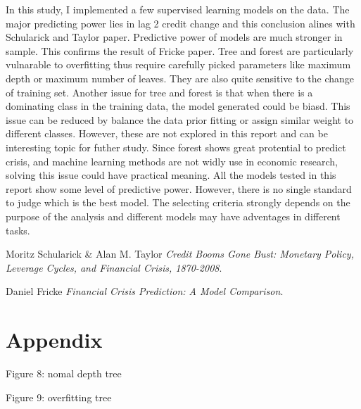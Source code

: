 \documentclass{article}
\newcommand{\ciapdf}[1]{\vspace*{-\parskip}\begin{center}\resizebox{0.75\textwidth}{!}{\texttt{[image: \#1]}}\end{center}}
\begin{document}
In this study, I implemented
a few supervised learning models on the data. The major predicting
power lies in lag 2 credit change and this conclusion alines with
Schularick and Taylor paper. Predictive power of models are much stronger in sample. This confirms the result of Fricke
paper. Tree and forest are particularly
vulnarable to overfitting thus require carefully picked parameters like
maximum depth or maximum number of leaves. They are also quite sensitive
to the change of training set. Another issue for
tree and forest is that when there is a dominating class in the training
data, the model generated could be biasd. This issue can be reduced by
balance the data prior fitting or assign similar weight to different
classes. However, these are not explored in this report and can be
interesting topic for futher study. Since forest shows great protential
to predict crisis, and machine learning methods are not widly use in
economic research, solving this issue could have practical meaning. All
the models tested in this report show some level of predictive power.
However, there is no single standard to judge which is the best model.
The selecting criteria strongly depends on the purpose of the analysis
and different models may have adventages in different tasks.

\begin{thebibliography}{9}
Moritz Schularick \& Alan M. Taylor
\textit{Credit Booms Gone Bust: Monetary Policy, Leverage Cycles, and Financial Crisis, 1870-2008}.

Daniel Fricke
\textit{Financial Crisis Prediction: A Model Comparison}.
\end{thebibliography}

\section*{Appendix}

Figure 8: nomal depth tree

\ciapdf{app_normaldepth.pdf}

Figure 9: overfitting tree 
\end{document}
